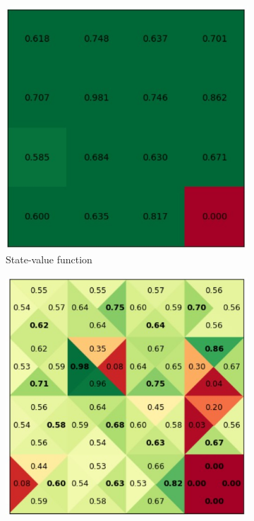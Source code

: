 \documentclass{article}
\begin{document}
\begin{enumerate}
\begin{figure}[H]
\begin{subfigure}[b]{0.5\linewidth}
		\includegraphics[width = \linewidth]{QV1.jpg}
		\caption{State-value function}
	\end{subfigure}
	\begin{subfigure}[b]{0.5\linewidth}
		\includegraphics[width = \linewidth]{QQ1.jpg}

\end{subfigure}
\end{figure}
\end{enumerate}
\end{document}
